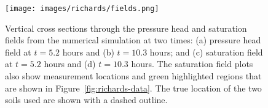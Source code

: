 \begin{figure}[ht]
\begin{center}
\texttt{[image: images/richards/fields.png]}
\end{center}
\caption{Vertical cross sections through the pressure head and saturation fields from the numerical simulation at two times: (a) pressure head field at $t=5.2$ hours and (b) $t=10.3$ hours; and (c) saturation field at $t=5.2$ hours and (d) $t=10.3$ hours. The saturation field plots also show measurement locations and green highlighted regions that are shown in Figure~\ref{fig:richards-data}. The true location of the two soils used are shown with a dashed outline.}
\label{fig:richards-fields}
\end{figure}
